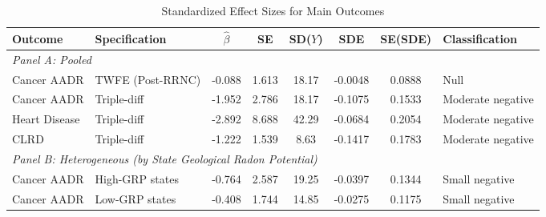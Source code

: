 \begin{table}[H]
\centering
\caption{Standardized Effect Sizes for Main Outcomes}
\label{tab:sde}
\begin{adjustbox}{max width=\textwidth}
\begin{threeparttable}
\begin{tabular}{llcccccl}
\toprule
Outcome & Specification & $\hat{\beta}$ & SE & SD($Y$) & SDE & SE(SDE) & Classification \\
\midrule
\multicolumn{8}{l}{\textit{Panel A: Pooled}} \\
Cancer AADR & TWFE (Post-RRNC) & -0.088 & 1.613 & 18.17 & -0.0048 & 0.0888 & Null \\
Cancer AADR & Triple-diff & -1.952 & 2.786 & 18.17 & -0.1075 & 0.1533 & Moderate negative \\
Heart Disease & Triple-diff & -2.892 & 8.688 & 42.29 & -0.0684 & 0.2054 & Moderate negative \\
CLRD & Triple-diff & -1.222 & 1.539 & 8.63 & -0.1417 & 0.1783 & Moderate negative \\
\midrule
\multicolumn{8}{l}{\textit{Panel B: Heterogeneous (by State Geological Radon Potential)}} \\
Cancer AADR & High-GRP states & -0.764 & 2.587 & 19.25 & -0.0397 & 0.1344 & Small negative \\
Cancer AADR & Low-GRP states & -0.408 & 1.744 & 14.85 & -0.0275 & 0.1175 & Small negative \\
\bottomrule
\end{tabular}
\begin{tablenotes}[flushleft]
\small

\end{tablenotes}
\end{threeparttable}
\end{adjustbox}
\end{table}
